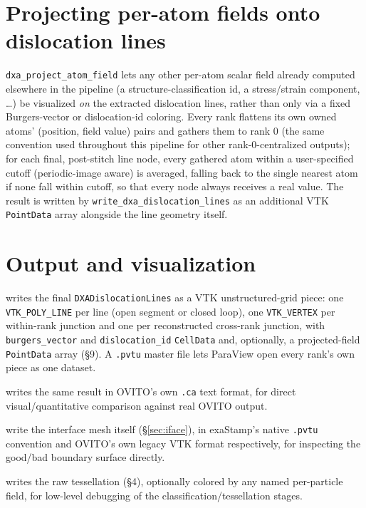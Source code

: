 \documentclass[11pt,a4paper]{article}
\newcommand{\op}[1]{\texttt{#1}}
\newcommand{\field}[1]{\texttt{#1}}
\newcommand{\code}[1]{\texttt{#1}}
\begin{document}
\section{Projecting per-atom fields onto dislocation lines}

\op{dxa\_project\_atom\_field} lets any other per-atom scalar field already computed elsewhere in
the pipeline (a structure-classification id, a stress/strain component, \ldots) be visualized
\emph{on} the extracted dislocation lines, rather than only via a fixed Burgers-vector or
dislocation-id coloring. Every rank flattens its own owned atoms' (position, field value) pairs and
gathers them to rank 0 (the same convention used throughout this pipeline for other
rank-0-centralized outputs); for each final, post-stitch line node, every gathered atom within a
user-specified cutoff (periodic-image aware) is averaged, falling back to the single nearest atom
if none fall within cutoff, so that every node always receives a real value. The result is written
by \op{write\_dxa\_dislocation\_lines} as an additional VTK \code{PointData} array alongside the
line geometry itself.

\section{Output and visualization}

\begin{description}[nosep]
  \item[\op{write\_dxa\_dislocation\_lines}] writes the final \code{DXADislocationLines} as a VTK
    unstructured-grid piece: one \code{VTK\_POLY\_LINE} per line (open segment or closed loop),
    one \code{VTK\_VERTEX} per within-rank junction and one per reconstructed cross-rank junction,
    with \field{burgers\_vector} and \field{dislocation\_id} \code{CellData} and, optionally, a
    projected-field \code{PointData} array (\S 9). A \code{.pvtu} master file lets ParaView open
    every rank's own piece as one dataset.
  \item[\op{write\_dxa\_ca\_file}] writes the same result in OVITO's own \code{.ca} text format, for
    direct visual/quantitative comparison against real OVITO output.
  \item[\op{write\_interface\_mesh}, \op{write\_ovito\_interface\_mesh}] write the interface mesh
    itself (\S\ref{sec:iface}), in exaStamp's native \code{.pvtu} convention and OVITO's own legacy
    VTK format respectively, for inspecting the good/bad boundary surface directly.
  \item[\op{write\_delaunay\_vtk}] writes the raw tessellation (\S 4), optionally colored by any
    named per-particle field, for low-level debugging of the classification/tessellation stages.
\end{description}
\end{document}
